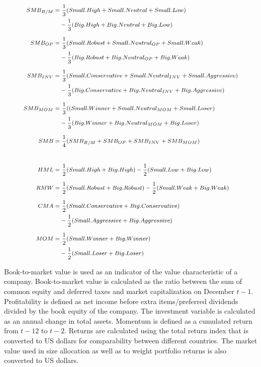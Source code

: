\documentclass[12pt]{article}
\begin{document}
\begin{equation} \label{eq:FF6factors}
\footnotesize
\begin{split}
SMB_{B/M} = & \ \frac{1}{3} (Small.High + Small.Neutral + Small.Low) \\
			& - \frac{1}{3} (Big.High + Big.Neutral + Big.Low) \\[5pt]
SMB_{OP} = & \ \frac{1}{3} (Small.Robust + Small.Neutral_{OP} + Small.Weak)\\
			& - \frac{1}{3} (Big.Robust + Big.Neutral_{OP} + Big.Weak)\\[5pt]
SMB_{INV} = & \ \frac{1}{3} (Small.Conservative + Small.Neutral_{INV} + Small.Aggressive)\\
			& - \frac{1}{3} (Big.Conservative + Big.Neutral_{INV} + Big.Aggressive)\\[5pt]
SMB_{MOM} = & \ \frac{1}{3} ((Small.Winner + Small.Neutral_{MOM} + Small.Loser)\\
		     	& - \frac{1}{3} (Big.Winner + Big.Neutral_{MOM} + Big.Loser)\\[5pt]
SMB = & \ \frac{1}{4} (SMB_{B/M} + SMB_{OP} + SMB_{INV} + SMB_{MOM})\\[20pt]
HML = & \ \frac{1}{2} (Small.High + Big.High) - \frac{1}{2} (Small.Low + Big.Low)\\[5pt]
RMW = & \ \frac{1}{2} (Small.Robust + Big.Robust) - \frac{1}{2} (Small.Weak + Big.Weak)\\[5pt]
CMA = & \ \frac{1}{2} (Small.Conservative + Big.Conservative)\\
		& - \frac{1}{2} (Small.Aggressive + Big.Aggressive)\\[5pt]
MOM = & \ \frac{1}{2} (Small.Winner + Big.Winner)\\
		& - \frac{1}{2} (Small.Loser + Big.Loser)\\
\end{split}
\end{equation}

Book-to-market value is used as an indicator of the value characteristic of a company. Book-to-market value is calculated as the ratio between the sum of common equity and deferred taxes and market capitalization on December $t-1$. Profitability is defined as net income before extra items/preferred dividends divided by the book equity of the company. The investment variable is calculated as an annual change in total assets. Momentum is defined as a cumulated return from $t-12$ to $t-2$. Returns are calculated using the total return index that is converted to US dollars for comparability between different countries. The market value used in size allocation as well as to weight portfolio returns is also converted to US dollars. \par
\end{document}
